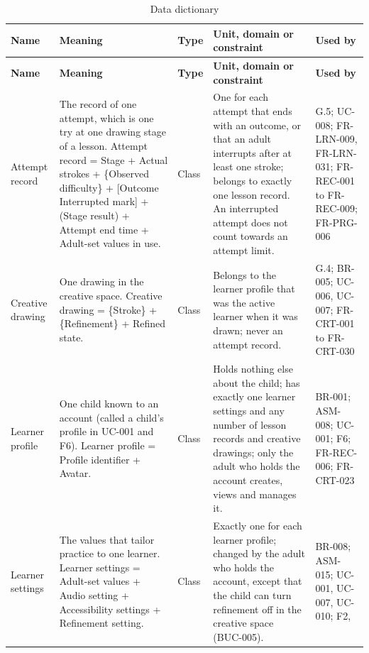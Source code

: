 \documentclass[12pt]{article}
\renewcommand{\_}{\textunderscore\allowbreak}%
\begin{document}
{\footnotesize
\setlength{\tabcolsep}{3pt}
\begin{longtable}{@{}
  >{\raggedright\arraybackslash}p{}
  >{\raggedright\arraybackslash}p{}
  >{\raggedright\arraybackslash}p{}
  >{\raggedright\arraybackslash}p{}
  >{\raggedright\arraybackslash\exhyphenpenalty=10000}%
    p{}@{}} \caption{Data
dictionary}\label{tab:data-dictionary}\\
\toprule
\textbf{Name} & \textbf{Meaning} & \textbf{Type} & \textbf{Unit, domain or
constraint} & \textbf{Used by} \\
\midrule
\endfirsthead
\toprule
\textbf{Name} & \textbf{Meaning} & \textbf{Type} & \textbf{Unit, domain or
constraint} & \textbf{Used by} \\
\midrule
\endhead
\bottomrule
\endlastfoot
Attempt record & The record of one attempt, which is one try at one drawing
stage of a lesson. Attempt record = Stage + Actual strokes + \{Observed
difficulty\} + [Outcome \textbar{} Interrupted mark] + (Stage result) + Attempt
end time + Adult-set values in use. & Class & One for each attempt that ends
with an outcome, or that an adult interrupts after at least one stroke; belongs
to exactly one lesson record. An interrupted attempt does not count towards an
attempt limit. & G.5; UC-008; FR-LRN-009, FR-LRN-031; FR-REC-001 to FR-REC-009; FR-PRG-006
\\
\addlinespace
Creative drawing & One drawing in the creative space. Creative drawing =
\{Stroke\} + \{Refinement\} + Refined state. & Class & Belongs to the learner
profile that was the active learner when it was drawn; never an attempt record.
& G.4; BR-005; UC-006, UC-007; FR-CRT-001 to FR-CRT-030 \\
\addlinespace
Learner profile & One child known to an account (called a child's profile in
UC-001 and F6). Learner profile = Profile identifier + Avatar. & Class & Holds nothing
else about the child; has exactly one learner settings and any number of lesson
records and creative drawings; only the adult who holds the account creates,
views and manages it. & BR-001; ASM-008; UC-001; F6; FR-REC-006; FR-CRT-023 \\
\addlinespace
Learner settings & The values that tailor practice to one learner. Learner
settings = Adult-set values + Audio setting + Accessibility settings +
Refinement setting. & Class & Exactly one for each learner profile; changed by
the adult who holds the account, except that the child can turn refinement off
in the creative space (BUC-005). & BR-008; ASM-015; UC-001, UC-007, UC-010; F2,

\end{longtable}}
\end{document}
